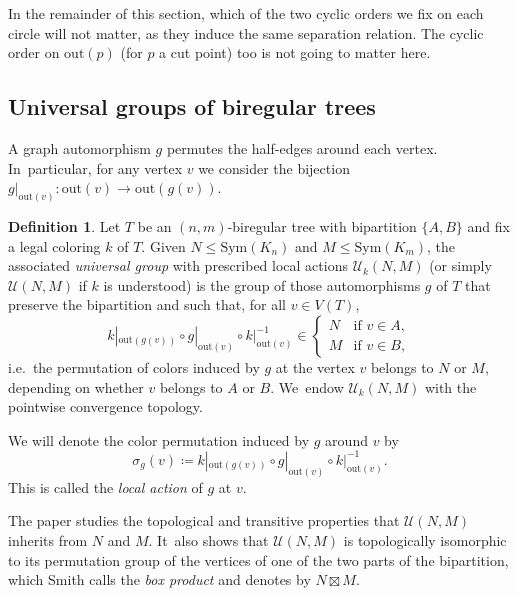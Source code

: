 \documentclass[10pt,a4paper]{amsart}
\newcommand{\ie}{i.e.\ }
\theoremstyle{definition}
\newtheorem{definition}[definition]{Definition}
\newcommand{\Sym}{\mathrm{Sym}}
\newcommand{\U}{\mathcal{U}}
\begin{document}
In the remainder of this section, which of the two cyclic orders we fix on each circle will not matter, as they induce the same separation relation.
The cyclic order on $\mathrm{out}(p)$ (for $p$ a cut point) too is not going to matter here.


\subsection{Universal groups of biregular trees}
\label{sub.universal.groups}

A graph automorphism $g$ permutes the half-edges around each vertex. In~particular, for any vertex $v$ we consider the bijection $g|_{\mathrm{out}(v)} \colon \mathrm{out}(v) \to \mathrm{out}(g(v))$.

\begin{definition}
\label{def.universal.group}
Let $T$ be an $(n,m)$-biregular tree with bipartition $\{A, B\}$ and fix a legal coloring $k$ of $T$.
Given $N \leq \Sym(K_n)$ and $M \leq \Sym(K_m)$, the associated \emph{universal group} with prescribed local actions $\U_k (N,M)$ (or simply $\U (N,M)$ if $k$ is understood) is the group of those automorphisms $g$ of $T$ that preserve the bipartition and such that, for all $v \in V(T)$,\vspace*{-3pt}
\begin{equation}
k|_{\mathrm{out}(g(v))} \circ g|_{\mathrm{out}(v)} \circ k|_{\mathrm{out}(v)}^{-1} \in
\begin{cases}
N & \text{if $v \in A$},\\
M & \text{if $v \in B$},
\end{cases}
\end{equation}
\ie the permutation of colors induced by $g$ at the vertex $v$ belongs to $N$ or $M$, depending on whether $v$ belongs to $A$ or $B$. We~endow $\U_k(N,M)$ with the pointwise convergence topology.
\end{definition}

We will denote the color permutation induced by $g$ around $v$ by\vspace*{-3pt}
\[
 \sigma_g(v) \coloneqq k|_{\mathrm{out}(g(v))} \circ g|_{\mathrm{out}(v)} \circ k|_{\mathrm{out}(v)}^{-1}. 
\]
This is called the \emph{local action} of $g$ at $v$.

The paper \cite{biregular} studies the topological and transitive properties that $\U(N,M)$ inherits from $N$ and $M$. It~also shows that $\U(N,M)$ is topologically isomorphic to its permutation group of the vertices of one of the two parts of the bipartition, which Smith calls the \textit{box product} and denotes by $N \boxtimes M$.
\end{document}
